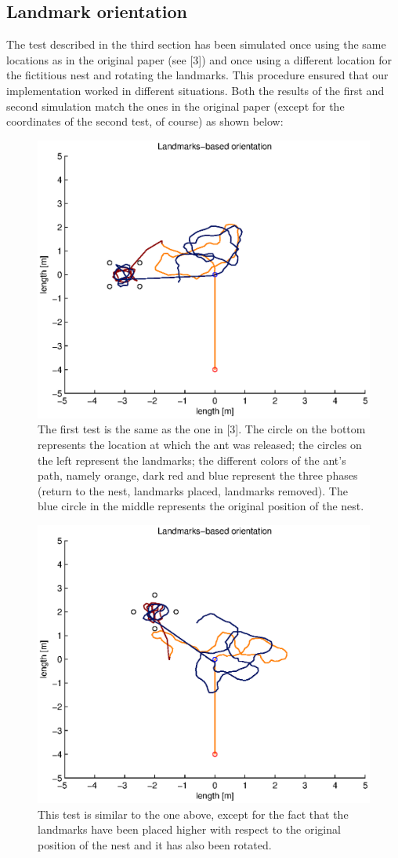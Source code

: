 \documentclass[11pt]{article}
\begin{document}
\subsection{Landmark orientation}
The test described in the third section has been simulated once using the same locations as in the original paper (see [3]) and once using a different location for the fictitious nest and rotating the landmarks. This procedure ensured that our implementation worked in different situations. Both the results of the first and second simulation match the ones in the original paper (except for the coordinates of the second test, of course) as shown below:
\begin{figure}[h!]
	\centering
	\includegraphics[width=.8\textwidth]{../sources/results/fourLandmarksResults/fourLandmarks.eps}
	\caption{The first test is the same as the one in [3]. The circle on the bottom represents the location at which the ant was released; the circles on the left represent the landmarks; the different colors of the ant's path, namely orange, dark red and blue represent the three phases (return to the nest, landmarks placed, landmarks removed). The blue circle in the middle represents the original position of the nest.}
\end{figure}
\begin{figure}[htbp!]
	\centering
	\includegraphics[width=.8\textwidth]{../sources/results/fourLandmarksResults/fourLandmarksRotated.eps}
	\caption{This test is similar to the one above, except for the fact that the landmarks have been placed higher with respect to the original position of the nest and it has also been rotated.}
\end{figure}
\end{document}
